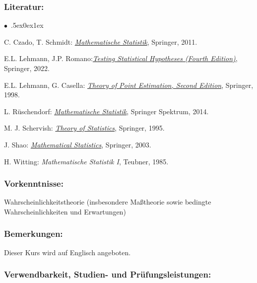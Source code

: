\documentclass[a4paper,10pt]{article}
\renewenvironment{itemize}{\begin{list}{$\bullet$\ }{\itemsep.5ex\setlength{\topsep}{0.5\itemsep}\parsep0ex\labelsep1ex\settowidth{\labelwidth}{$\bullet$\ }\setlength{\leftmargin}{\labelwidth}\addtolength{\leftmargin}{3ex}\addtolength{\leftmargin}{\labelsep}}}{\end{list}}
\begin{document}
\subsubsection*{\large
    Literatur:
}
\begin{itemize}
\item C. Czado, T. Schmidt: \href{https://link.springer.com/book/10.1007/978-3-642-17261-8}{\emph{Mathematische Statistik}}, Springer, 2011.
\item E.L. Lehmann, J.P. Romano:\href{https://link.springer.com/book/10.1007/978-3-030-70578-7}{\emph{Testing Statistical Hypotheses (Fourth Edition)}}, Springer, 2022.
\item E.L. Lehmann, G. Casella: \href{https://link.springer.com/book/10.1007/b98854}{\emph{Theory of Point Estimation, Second Edition}}, Springer, 1998. 
\item  L. Rüschendorf: \href{https://link.springer.com/book/10.1007/978-3-642-41997-3}{\emph{Mathematische Statistik}}, Springer Spektrum, 2014. 
\item  M. J. Schervish: \href{https://link.springer.com/book/10.1007/978-1-4612-4250-5}{\emph{Theory of Statistics}}, Springer, 1995.
\item J. Shao:  \href{https://link.springer.com/book/10.1007/b97553}{\emph{Mathematical Statistics}}, Springer, 2003.
\item H. Witting: \emph{Mathematische Statistik I}, Teubner, 1985.
\end{itemize}
\subsubsection*{\large
    Vorkenntnisse:
}
Wahrscheinlichkeitstheorie (insbesondere Maßtheorie sowie bedingte Wahrscheinlichkeiten und Erwartungen)
\subsubsection*{\large
    Bemerkungen:
}
Dieser Kurs wird auf Englisch angeboten.
\subsubsection*{\large
    Verwendbarkeit, Studien- und Prüfungsleistungen:
}
\end{document}

